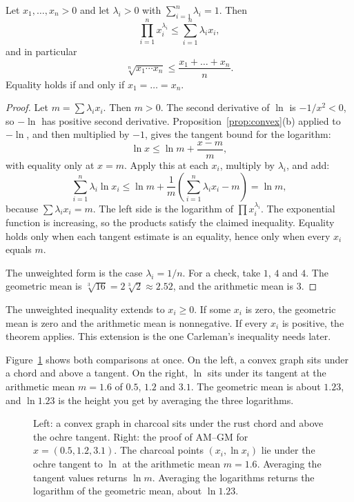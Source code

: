 \begin{theorem}[AM--GM]\label{thm:amgm}
Let $x_1,\dots,x_n>0$ and let $\lambda_i>0$ with $\sum_{i=1}^n\lambda_i=1$. Then
\[
\prod_{i=1}^nx_i^{\lambda_i}\le\sum_{i=1}^n\lambda_ix_i,
\]
and in particular
\[
\sqrt[n]{x_1\cdots x_n}\le\frac{x_1+\dots+x_n}n.
\]
Equality holds if and only if $x_1=\dots=x_n$.
\end{theorem}
\begin{proof}
Let $m=\sum\lambda_ix_i$. Then $m>0$. The second derivative of $\ln$ is $-1/x^2<0$, so $-\ln$ has positive second derivative. Proposition~\ref{prop:convex}(b) applied to $-\ln$, and then multiplied by $-1$, gives the tangent bound for the logarithm:
\[
\ln x\le\ln m+\frac{x-m}m,
\]
with equality only at $x=m$. Apply this at each $x_i$, multiply by $\lambda_i$, and add:
\[
\sum_{i=1}^n\lambda_i\ln x_i\le\ln m+\frac1m\left(\sum_{i=1}^n\lambda_ix_i-m\right)=\ln m,
\]
because $\sum\lambda_ix_i=m$. The left side is the logarithm of $\prod x_i^{\lambda_i}$. The exponential function is increasing, so the products satisfy the claimed inequality. Equality holds only when each tangent estimate is an equality, hence only when every $x_i$ equals $m$.

The unweighted form is the case $\lambda_i=1/n$. For a check, take $1$, $4$ and $4$. The geometric mean is $\sqrt[3]{16}=2\sqrt[3]{2}\approx2.52$, and the arithmetic mean is $3$.
\end{proof}

The unweighted inequality extends to $x_i\ge0$. If some $x_i$ is zero, the geometric mean is zero and the arithmetic mean is nonnegative. If every $x_i$ is positive, the theorem applies. This extension is the one Carleman's inequality needs later.

Figure~\ref{fig:convex} shows both comparisons at once. On the left, a convex graph sits under a chord and above a tangent. On the right, $\ln$ sits under its tangent at the arithmetic mean $m=1.6$ of $0.5$, $1.2$ and $3.1$. The geometric mean is about $1.23$, and $\ln1.23$ is the height you get by averaging the three logarithms.

\begin{figure}[ht]
\centering
{}
\caption{Left: a convex graph in charcoal sits under the rust chord and above the ochre tangent. Right: the proof of AM--GM for $x=(0.5,1.2,3.1)$. The charcoal points $(x_i,\ln x_i)$ lie under the ochre tangent to $\ln$ at the arithmetic mean $m=1.6$. Averaging the tangent values returns $\ln m$. Averaging the logarithms returns the logarithm of the geometric mean, about $\ln1.23$.}
\label{fig:convex}
\end{figure}

